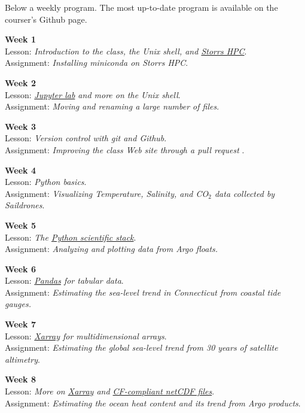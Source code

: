 \documentclass[11pt]{article}
\begin{document}
Below a weekly program. The most up-to-date program is available on the courser's Github page.

\textbf{Week 1}\\
 Lesson: \textit{Introduction to the class, the Unix shell, and \href{https://hpc.uconn.edu/}{Storrs HPC}}.\\
 Assignment: \textit{Installing miniconda on Storrs HPC}.

\textbf{Week 2}\\
 Lesson: \textit{\href{https://jupyter.org}{Jupyter lab} and more on the Unix shell}.\\
 Assignment: \textit{Moving and renaming a large number of files}.

\textbf{Week 3} \\
Lesson: \textit{Version control with git and Github}.\\
Assignment:  \textit{Improving the class Web site through a pull request  }.

\textbf{Week 4}\\
 Lesson: \textit{Python basics}.\\
 Assignment: \textit{Visualizing Temperature, Salinity, and CO$_2$  data collected by Saildrones}.
 
 \textbf{Week 5}\\
 Lesson: \textit{The \href{https://www.scipy.org/about.html}{Python scientific stack}}.\\
 Assignment: \textit{Analyzing and plotting data from Argo floats.}
 
\textbf{Week 6}\\
 Lesson: \textit{\href{https://pandas.pydata.org}{Pandas} for tabular data}.\\
 Assignment: \textit{Estimating the sea-level trend in Connecticut from coastal tide gauges.}

\textbf{Week 7}\\
 Lesson: \textit{\href{http://xarray.pydata.org/en/stable/}{Xarray} for multidimensional arrays}.\\
 Assignment: \textit{Estimating the global sea-level trend  from  30 years  of satellite altimetry}.

\textbf{Week 8}\\
 Lesson: \textit{More on \href{http://xarray.pydata.org/en/stable/}{Xarray} and \href{https://cfconventions.org}{CF-compliant netCDF files}}.\\
 Assignment: \textit{Estimating the ocean heat content and its trend from Argo products}.
\end{document}
